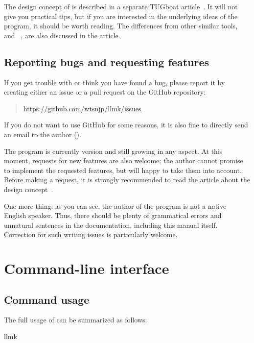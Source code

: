 \documentclass[draft]{llmk-doc}
\begin{document}
The design concept of  is described in a separate TUGboat
article~\cite{asakura2020}. It will not give you practical tips, but if you are
interested in the underlying ideas of the program, it should be worth reading.
The differences from other similar tools, \eg{}~\cite{latexmk} and
~\cite{arara}, are also discussed in the article.

\subsection{Reporting bugs and requesting features}

If you get trouble with  or think you have found a bug, please
report it by creating either an issue or a pull request on the GitHub
repository:
%
\begin{quote}
\url{https://github.com/wtsnjp/llmk/issues}
\end{quote}
%
If you do not want to use GitHub for some reasons, it is also fine to directly
send an email to the author ().

The  program is currently version  and still growing in
any aspect. At this moment, requests for new features are also welcome; the
author cannot promise to implement the requested features, but will happy to
take them into account. Before making a request, it is strongly recommended to
read the article about the design concept~\cite{asakura2020}.

One more thing: as you can see, the author of the program is not a native
English speaker. Thus, there should be plenty of grammatical errors and
unnatural sentences in the documentation, including this manual itself.
Correction for such writing issues is particularly welcome.

\section{Command-line interface}

\subsection{Command usage}
\label{sec:command}

The full usage of  can be summarized as follows:
%
\begin{htcode}
llmk  
\end{htcode}
\end{document}
